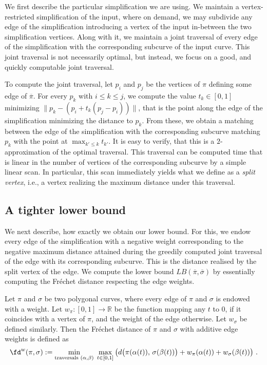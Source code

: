 We first describe the particular simplification we are using. We maintain a vertex-restricted simplification of the input, where on demand, we may subdivide any edge of the simplification introducing a vertex of the input in-between the two simplification vertices. Along with it, we maintain a joint traversal of every edge of the simplification with the corresponding subcurve of the input curve. This joint traversal is not necessarily optimal, but instead, we focus on a good, and quickly computable joint traversal. 

To compute the joint traversal, let $p_i$ and $p_j$ be the vertices of $\pi$ defining some edge of $\overline{\pi}$. For every $p_k$ with $i\leq k\leq j$, we compute the value $t_k\in[0,1]$ minimizing $\|p_k-(p_i+t_k(p_j-p_i))\|$, that is the point along the edge of the simplification minimizing the distance to $p_k$. From these, we obtain a matching between the edge of the simplification with the corresponding subcurve matching $p_k$ with the point at $\max_{k'\leq k}t_{k'}$. It is easy to verify, that this is a $2$-approximation of the optimal traversal. 
This traversal can be computed time that is linear in the number of vertices of the corresponding subcurve by a simple linear scan. In particular, this scan immediately yields what we define as a \emph{split vertex}, i.e., a vertex realizing the maximum distance under this traversal.

\subsection{A tighter lower bound}

We next describe, how exactly we obtain our lower bound. For this, we endow every edge of the simplification with a negative weight corresponding to the negative maximum distance attained during the greedily computed joint traversal of the edge with its corresponding subcurve. This is the distance realised by the split vertex of the edge.  We compute the lower bound $LB(\overline{\pi},\overline{\sigma})$ by essentially computing the Fréchet distance respecting the edge weights. 

\begin{definition}
    Let $\pi$ and $\sigma$ be two polygonal curves, where every edge of $\pi$ and $\sigma$ is endowed with a weight. Let $w_\pi:[0,1]\rightarrow\mathbb{R}$ be the function mapping any $t$ to $0$, if it coincides with a vertex of $\pi$, and the weight of the edge otherwise. Let $w_\sigma$ be defined similarly. Then the Fréchet distance of $\pi$ and $\sigma$ with additive edge weights is defined as
    \[\fd^w(\pi,\sigma):= \min\limits_{\text{traversals } (\alpha,\beta)}\;
           \max\limits_{t \in [0,1]}\left( d\bigl( \pi(\alpha(t)),\, \sigma(\beta(t)) \bigr) + w_\pi(\alpha(t)) + w_\sigma(\beta(t))\right)\, .\]
\end{definition}


